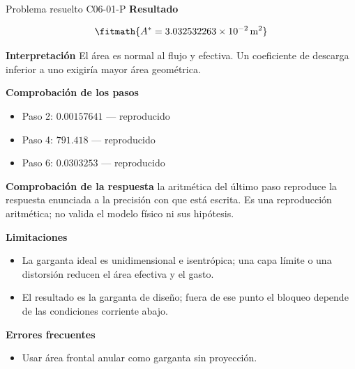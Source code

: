\documentclass[10pt,openany]{book}
\begin{document}
\begin{studiumworked}{Problema resuelto C06-01-P}
\noindent\textbf{Resultado}

\[
\fitmath{A^{*}=3.032532263\times10^{-2}\,\mathrm{m}^{2}}
\]

\noindent\textbf{Interpretación}
El área es normal al flujo y efectiva. Un coeficiente de descarga inferior a uno exigiría mayor área geométrica.

\noindent\textbf{Comprobación de los pasos}
\begin{itemize}
\item Paso 2: $0.00157641$ — reproducido
\item Paso 4: $791.418$ — reproducido
\item Paso 6: $0.0303253$ — reproducido
\end{itemize}

\noindent\textbf{Comprobación de la respuesta} la aritmética del último paso reproduce la respuesta enunciada a la precisión con que está escrita. Es una reproducción aritmética; no valida el modelo físico ni sus hipótesis.

\noindent\textbf{Limitaciones}
\begin{itemize}
\item La garganta ideal es unidimensional e isentrópica; una capa límite o una distorsión reducen el área efectiva y el gasto.
\item El resultado es la garganta de diseño; fuera de ese punto el bloqueo depende de las condiciones corriente abajo.
\end{itemize}

\noindent\textbf{Errores frecuentes}
\begin{itemize}
\item Usar área frontal anular como garganta sin proyección.
\end{itemize}
\end{studiumworked}
\end{document}
